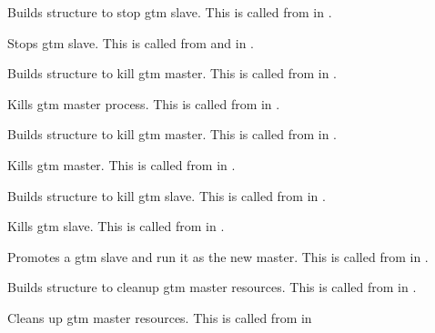   
      Builds  structure to stop gtm slave.
      This is called from  in .
  
  
      Stops gtm slave.
      This is called from  and  in .
  
  
      Builds  structure to kill gtm master.
      This is called from  in .
  
  
      Kills gtm master process.
      This is called from  in .
  
  
      Builds  structure to kill gtm master.
      This is called from  in .
  
  
  
      Kills gtm master.
      This is called from  in .
  
  
      Builds  structure to kill gtm slave.
      This is called from  in .
  
  
      Kills gtm slave.
      This is called from  in .
  
  
      Promotes a gtm slave and run it as the new master.
      This is called from  in .
  
  
      Builds  structure to cleanup gtm master resources.
      This is called from  in .
  
  
      Cleans up gtm master resources.
      This is called from  in 
  
  
